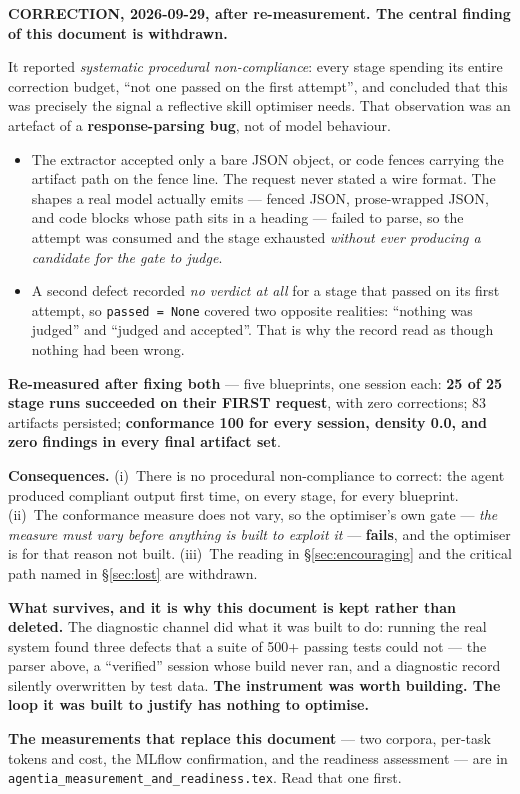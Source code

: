 \documentclass[11pt,a4paper]{article}
\begin{document}
\begin{notebox}[colframe=warn]
\textbf{CORRECTION, 2026-09-29, after re-measurement. The central finding of this
document is withdrawn.}

It reported \emph{systematic procedural non-compliance}: every stage spending its
entire correction budget, ``not one passed on the first attempt'', and concluded that
this was precisely the signal a reflective skill optimiser needs. That observation
was an artefact of a \textbf{response-parsing bug}, not of model behaviour.

\begin{itemize}[leftmargin=1.4em]
  \item The extractor accepted only a bare JSON object, or code fences carrying the
  artifact path on the fence line. The request never stated a wire format. The shapes
  a real model actually emits --- fenced JSON, prose-wrapped JSON, and code blocks
  whose path sits in a heading --- failed to parse, so the attempt was consumed and
  the stage exhausted \emph{without ever producing a candidate for the gate to judge}.
  \item A second defect recorded \emph{no verdict at all} for a stage that passed on
  its first attempt, so \texttt{passed = None} covered two opposite realities:
  ``nothing was judged'' and ``judged and accepted''. That is why the record read as
  though nothing had been wrong.
\end{itemize}

\textbf{Re-measured after fixing both} --- five blueprints, one session each:
\textbf{25 of 25 stage runs succeeded on their FIRST request}, with zero corrections;
83 artifacts persisted; \textbf{conformance 100 for every session, density 0.0, and
zero findings in every final artifact set}.

\textbf{Consequences.} (i)~There is no procedural non-compliance to correct: the
agent produced compliant output first time, on every stage, for every blueprint.
(ii)~The conformance measure does not vary, so the optimiser's own gate ---
\emph{the measure must vary before anything is built to exploit it} ---
\textbf{fails}, and the optimiser is for that reason not built.
(iii)~The reading in \S\ref{sec:encouraging} and the critical path named in
\S\ref{sec:lost} are withdrawn.

\textbf{What survives, and it is why this document is kept rather than deleted.}
The diagnostic channel did what it was built to do: running the real system found
three defects that a suite of 500+ passing tests could not --- the parser above, a
``verified'' session whose build never ran, and a diagnostic record silently
overwritten by test data. \textbf{The instrument was worth building. The loop it was
built to justify has nothing to optimise.}

\textbf{The measurements that replace this document} --- two corpora, per-task tokens
and cost, the MLflow confirmation, and the readiness assessment --- are in
\texttt{agentia\_measurement\_and\_readiness.tex}. Read that one first.
\end{notebox}
\end{document}
